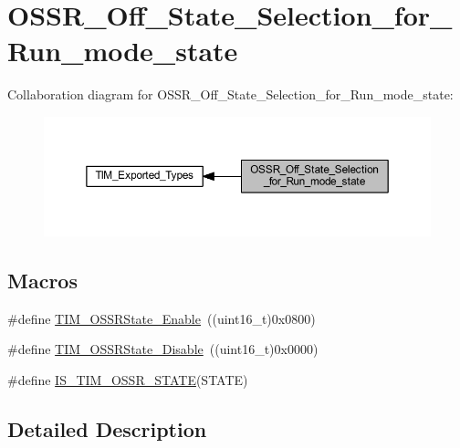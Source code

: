 \hypertarget{group___o_s_s_r___off___state___selection__for___run__mode__state}{}\section{O\+S\+S\+R\+\_\+\+Off\+\_\+\+State\+\_\+\+Selection\+\_\+for\+\_\+\+Run\+\_\+mode\+\_\+state}
\label{group___o_s_s_r___off___state___selection__for___run__mode__state}
Collaboration diagram for O\+S\+S\+R\+\_\+\+Off\+\_\+\+State\+\_\+\+Selection\+\_\+for\+\_\+\+Run\+\_\+mode\+\_\+state\+:
\nopagebreak
\begin{figure}[H]
\begin{center}
\leavevmode
\includegraphics[width=350pt]{group___o_s_s_r___off___state___selection__for___run__mode__state}
\end{center}
\end{figure}
\subsection*{Macros}
\begin{DoxyCompactItemize}
\item 
\#define \hyperlink{group___o_s_s_r___off___state___selection__for___run__mode__state_ga3703ba6189db045bec48c864289f997e}{T\+I\+M\+\_\+\+O\+S\+S\+R\+State\+\_\+\+Enable}~((uint16\+\_\+t)0x0800)
\item 
\#define \hyperlink{group___o_s_s_r___off___state___selection__for___run__mode__state_ga766dfd8b3c32ec1b8b446f0e2dbe7b97}{T\+I\+M\+\_\+\+O\+S\+S\+R\+State\+\_\+\+Disable}~((uint16\+\_\+t)0x0000)
\item 
\#define \hyperlink{group___o_s_s_r___off___state___selection__for___run__mode__state_ga48b4f15f6346e28087edbb9af2ba4f63}{I\+S\+\_\+\+T\+I\+M\+\_\+\+O\+S\+S\+R\+\_\+\+S\+T\+A\+TE}(S\+T\+A\+TE)
\end{DoxyCompactItemize}


\subsection{Detailed Description}


